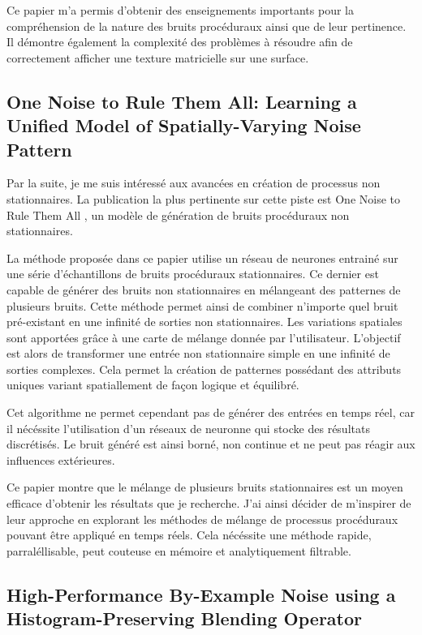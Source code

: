 \documentclass{article}
\begin{document}
Ce papier m'a permis d'obtenir des enseignements importants pour la
compréhension de la nature des bruits procéduraux ainsi que de leur pertinence.
Il démontre également la complexité des problèmes à résoudre afin de
correctement afficher une texture matricielle sur une surface.

\subsection{One Noise to Rule Them All: Learning a Unified
    Model of Spatially-Varying Noise Pattern}

Par la suite, je me suis intéressé aux avancées en création de processus non
stationnaires. La publication la plus pertinente sur cette piste est One Noise
to Rule Them All \cite{One_Noise}, un modèle de génération de bruits
procéduraux non stationnaires.

La méthode proposée dans ce papier utilise un réseau de neurones entrainé sur
une série d'échantillons de bruits procéduraux stationnaires. Ce dernier est
capable de générer des bruits non stationnaires en mélangeant des patternes de
plusieurs bruits. Cette méthode permet ainsi de combiner n'importe quel bruit
pré-existant en une infinité de sorties non stationnaires. Les variations
spatiales sont apportées grâce à une carte de mélange donnée par l'utilisateur.
L'objectif est alors de transformer une entrée non stationnaire simple en une
infinité de sorties complexes. Cela permet la création de patternes possédant
des attributs uniques variant spatiallement de façon logique et équilibré.

Cet algorithme ne permet cependant pas de générer des entrées en temps réel,
car il nécéssite l'utilisation d'un réseaux de neuronne qui stocke des
résultats discrétisés. Le bruit généré est ainsi borné, non continue et ne peut
pas réagir aux influences extérieures.

Ce papier montre que le mélange de plusieurs bruits stationnaires est un moyen
efficace d'obtenir les résultats que je recherche. J'ai ainsi décider de
m'inspirer de leur approche en explorant les méthodes de mélange de processus
procéduraux pouvant être appliqué en temps réels. Cela nécéssite une méthode
rapide, parraléllisable, peut couteuse en mémoire et analytiquement filtrable.

\subsection{High-Performance By-Example Noise
    using a Histogram-Preserving Blending Operator}
\end{document}
